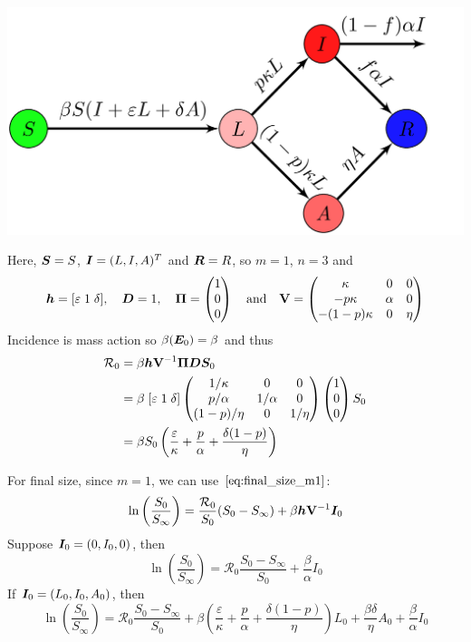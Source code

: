 \documentclass[aspectratio=169]{beamer}\usepackage[]{graphicx}\usepackage[]{xcolor}
\begin{document}
\begin{frame}
\centering
\includegraphics[width=\textwidth]{FIGS/SLIAR_infectiousL}
\end{frame}  


\begin{frame}
Here, $\bm{S}=S$, $\bm{I}=(L,I,A)^T$ and $\bm{R}=R$, so $m=1$, $n=3$ and 
$$
\bm{h}=[\varepsilon\; 1\; \delta],
\quad
\bm{D}=1,
\quad 
\bm{\Pi}
=\begin{pmatrix}
1 \\ 0 \\0
\end{pmatrix}
\quad\text{and}\quad
\mathbf{V}=
\begin{pmatrix}
\kappa & 0 & 0 \\
-p\kappa & \alpha & 0 \\
-(1-p)\kappa & 0 & \eta
\end{pmatrix}
$$
Incidence is mass action so $\beta(\bm{E}_0)=\beta$ and thus
\begin{align*}
\mathcal{R}_0
&=
\beta\bm{h}\mathbf{V}^{-1}\bm{\Pi}\bm{D}\bm{S}_0 \\
&=
\beta\;
[\varepsilon\; 1\; \delta]
\begin{pmatrix}
1/\kappa & 0 & 0 \\
p/\alpha & 1/\alpha & 0 \\
(1-p)/\eta & 0 & 1/\eta
\end{pmatrix}
\begin{pmatrix}
1 \\ 0 \\0
\end{pmatrix}
S_0 \\
&=
\beta S_0\left(
\frac{\varepsilon}{\kappa}
+\frac{p}{\alpha}
+\frac{\delta(1-p)}{\eta}
\right)
\end{align*}
\end{frame}  

\begin{frame}
For final size, since $m=1$, we can use $\eqref{eq:final_size_m1}$:
\[
\ln\left(
\frac{S_0}{S_\infty}
\right)
=\frac{\mathcal{R}_0}{S_0}
(S_0-S_\infty)+\beta\bm{h}\mathbf{V}^{-1}\bm{I}_0
\]
\vfill
Suppose $\bm{I}_0=(0,I_0,0)$, then
\[
\ln\left(
\frac{S_0}{S_\infty}
\right)
=\mathcal{R}_0\frac{S_0-S_\infty}{S_0}
+\frac{\beta}{\alpha}I_0
\]
\vfill
If $\bm{I}_0=(L_0,I_0,A_0)$, then
\[
\ln\left(
\frac{S_0}{S_\infty}
\right)
=\mathcal{R}_0\frac{S_0-S_\infty}{S_0}
+\beta\left(
\frac{\varepsilon}{\kappa}
+\frac{p}{\alpha}
+\frac{\delta(1-p)}{\eta}
\right)L_0
+\frac{\beta\delta}{\eta}A_0
+\frac{\beta}{\alpha}I_0
\]
\end{frame}  
\end{document}
